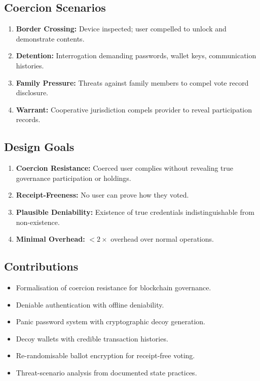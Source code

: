 \documentclass[11pt,a4paper]{article}
\begin{document}
\subsection{Coercion Scenarios}

\begin{enumerate}[label=\textbf{S\arabic*:}]
    \item \textbf{Border Crossing:} Device inspected; user compelled to
    unlock and demonstrate contents.
    \item \textbf{Detention:} Interrogation demanding passwords, wallet
    keys, communication histories.
    \item \textbf{Family Pressure:} Threats against family members to
    compel vote record disclosure.
    \item \textbf{Warrant:} Cooperative jurisdiction compels provider to
    reveal participation records.
\end{enumerate}

\subsection{Design Goals}

\begin{enumerate}
    \item \textbf{Coercion Resistance:} Coerced user complies without
    revealing true governance participation or holdings.
    \item \textbf{Receipt-Freeness:} No user can prove how they voted.
    \item \textbf{Plausible Deniability:} Existence of true credentials
    indistinguishable from non-existence.
    \item \textbf{Minimal Overhead:} $<2\times$ overhead over normal
    operations.
\end{enumerate}

\subsection{Contributions}

\begin{itemize}
    \item Formalisation of coercion resistance for blockchain governance.
    \item Deniable authentication with offline deniability.
    \item Panic password system with cryptographic decoy generation.
    \item Decoy wallets with credible transaction histories.
    \item Re-randomisable ballot encryption for receipt-free voting.
    \item Threat-scenario analysis from documented state practices.
\end{itemize}
\end{document}

